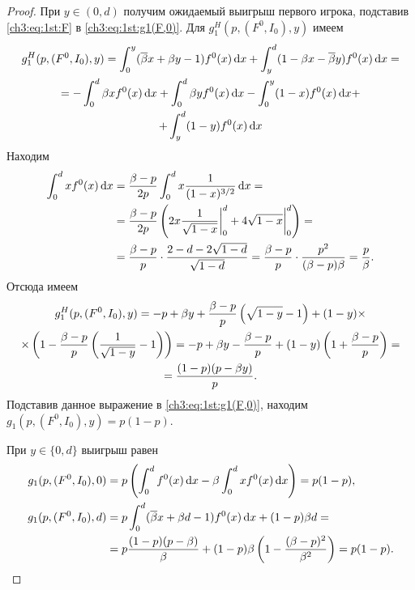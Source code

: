 {\begin{lemma}
\end{lemma}
\begin{proof}
  При $y \in (0, d)$ получим ожидаемый выигрыш первого игрока, подставив \eqref{ch3:eq:1st:F} в \eqref{ch3:eq:1st:g1(F,0)}.
  Для $g^H_1(p, (F^0, I_0), y)$ имеем
  \begin{equation*}
    \begin{gathered}
    g^H_1(p, (F^0, I_0), y) 
    =
    \int_0^y ({{\overline{\beta}}} x + \beta y - 1) f^0(x) \mathop{}\!\mathrm{d} x +
    \int_y^d (1 - \beta x - {{\overline{\beta}}} y) f^0(x) \mathop{}\!\mathrm{d} x = \\
    =
    - \int_0^d \beta x f^0(x) \mathop{}\!\mathrm{d} x +
    \int_0^d \beta y f^0(x) \mathop{}\!\mathrm{d} x -
    \int_0^y (1-x) f^0(x) \mathop{}\!\mathrm{d} x + \\
    + \int_y^d (1-y) f^0(x) \mathop{}\!\mathrm{d} x
    \end{gathered}
  \end{equation*}
  Находим
  \begin{equation}
    \label{ch3:eq:1st:f-exp}
    \begin{aligned}
      \int_0^d x f^0(x) \mathop{}\!\mathrm{d} x 
      &= \frac{\beta - p}{2 p} \int_0^d x \frac{1}{(1-x)^{3/2}} \mathop{}\!\mathrm{d} x = \\
      &= \frac{\beta - p}{2 p} \left( 
        2x \frac{1}{\sqrt{1-x}} \bigg|_0^d +
        4 \sqrt{1-x} \bigg|_0^d
      \right) = \\
      &= \frac{\beta - p}{p} \cdot \frac{2 - d - 2\sqrt{1-d}}{\sqrt{1-d}} =
      \frac{\beta - p}{p} \cdot \frac{p^2}{(\beta - p) \beta} = \frac{p}{\beta}.
    \end{aligned}
  \end{equation}
  Отсюда имеем
  \begin{gather*}
    g^H_1(p, (F^0, I_0), y) 
    = -p + \beta y +
    \frac{\beta - p}{p} \left( \sqrt{1-y} - 1 \right) +
    (1-y) \times \\
    \times \left( 1 - \frac{\beta - p}{p} \left( \frac{1}{\sqrt{1-y}} - 1 \right) \right) =
    -p + \beta y - \frac{\beta - p}{p} + (1-y) \left( 1 + \frac{\beta - p}{p} \right) = \\
    = \frac{(1-p)(p - \beta y)}{p}.
  \end{gather*}
  Подставив данное выражение в \eqref{ch3:eq:1st:g1(F,0)}, находим $g_1(p, (F^0, I_0), y) = p (1-p)$.

  При $y \in \{0, d\}$ выигрыш равен
  \begin{align*}
    g_1(p, (F^0, I_0), 0) 
    &= p \left(\int_0^d f^0(x) \mathop{}\!\mathrm{d} x - \beta \int_0^d x f^0(x) \mathop{}\!\mathrm{d} x \right) =
      p(1-p),\\
    g_1(p, (F^0, I_0), d) 
    &=
      p \int_0^d ({{\overline{\beta}}} x + \beta d - 1) f^0(x) \mathop{}\!\mathrm{d} x + (1-p) \beta d = \\
    &= p \frac{(1-p)(p-\beta)}{\beta} +
      (1-p) \beta \left( 1 - \frac{(\beta - p)^2}{\beta^2} \right) = p(1-p).
  \end{align*}


\end{proof}}
